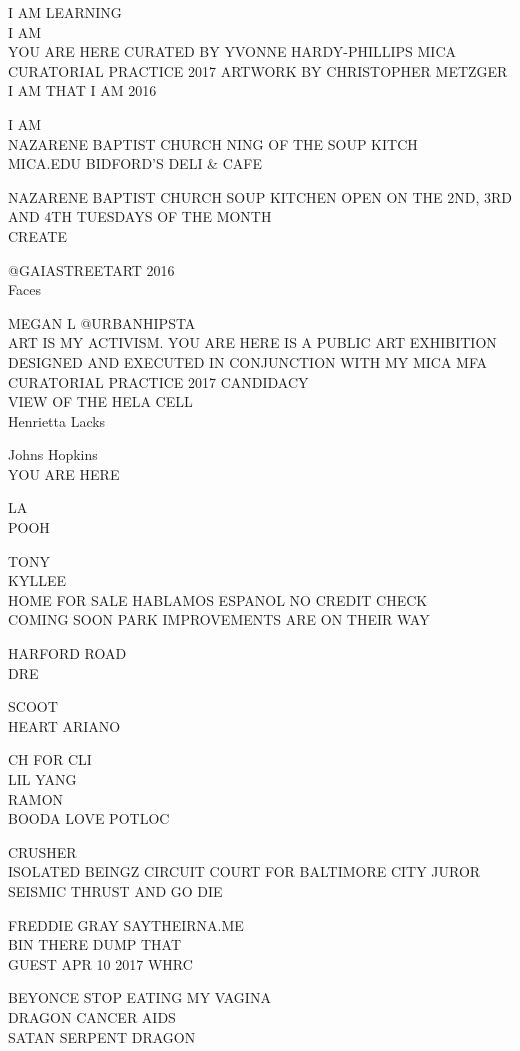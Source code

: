 \documentclass[10pt,letterpaper]{article}
\begin{document}
I AM LEARNING\\
I AM\\
YOU ARE HERE CURATED BY YVONNE HARDY{-}PHILLIPS MICA CURATORIAL PRACTICE 2017 ARTWORK BY CHRISTOPHER METZGER I AM THAT I AM 2016

I AM\\
NAZARENE BAPTIST CHURCH NING OF THE SOUP KITCH\\
MICA.EDU BIDFORD'S DELI \& CAFE

NAZARENE BAPTIST CHURCH SOUP KITCHEN OPEN ON THE 2ND, 3RD AND 4TH TUESDAYS OF THE MONTH\\
CREATE

@GAIASTREETART 2016\\
Faces

MEGAN L @URBANHIPSTA\\
ART IS MY ACTIVISM.  YOU ARE HERE IS A PUBLIC ART EXHIBITION DESIGNED AND EXECUTED IN CONJUNCTION WITH MY MICA MFA CURATORIAL PRACTICE 2017 CANDIDACY\\
VIEW OF THE HELA CELL\\
Henrietta Lacks

Johns Hopkins\\
YOU ARE HERE

LA\\
POOH

TONY\\
KYLLEE\\
HOME FOR SALE HABLAMOS ESPANOL NO CREDIT CHECK\\
COMING SOON PARK IMPROVEMENTS ARE ON THEIR WAY

HARFORD ROAD\\
DRE

SCOOT\\
HEART ARIANO

CH FOR CLI\\
LIL YANG\\
RAMON\\
BOODA LOVE POTLOC

CRUSHER\\
ISOLATED BEINGZ CIRCUIT COURT FOR BALTIMORE CITY JUROR\\
SEISMIC THRUST AND GO DIE

FREDDIE GRAY SAYTHEIRNA.ME\\
BIN THERE DUMP THAT\\
GUEST APR 10 2017 WHRC

BEYONCE STOP EATING MY VAGINA\\
DRAGON CANCER AIDS\\
SATAN SERPENT DRAGON
\end{document}
